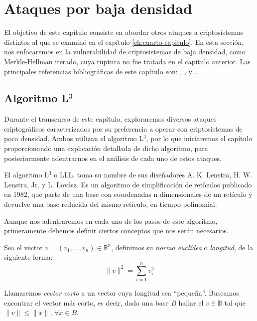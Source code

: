\chapter{Ataques por baja densidad} \label{ch:quinto-capitulo}

     El objetivo de este capítulo consiste en abordar otros ataques a criptosistemas distintos al que se examinó en el capítulo \ref{ch:cuarto-capitulo}. En esta sección, nos enfocaremos en la vulnerabilidad de criptosistemas de baja densidad, como Merkle-Hellman iterado, cuya ruptura no fue tratada en el capítulo anterior. Las principales referencias bibliográficas de este capítulo son: \cite{artLagOdl}, \cite{artLLL}, \cite{artCoster} y \cite{tfgLag}.
    
    \section{Algoritmo L\texorpdfstring{$^3$}{3}}

    Durante el transcurso de este capítulo, exploraremos diversos ataques criptográficos caracterizados por su preferencia a operar con criptosistemas de poca densidad. Ambos utilizan el algoritmo L$^{3}$, por lo que iniciaremos el capítulo proporcionando una explicación detallada de dicho algoritmo, para posteriormente adentrarnos en el análisis de cada uno de estos ataques.

    El algoritmo L$^{3}$ o LLL, toma su nombre de sus diseñadores A. K. Lenstra, H. W. Lenstra, Jr. y L. Lovász. Es un algoritmo de simplificación de retículos publicado en $1982$, que parte de una base con coordenadas n-dimensionales de un retículo y devuelve una base reducida del mismo retículo, en tiempo polinomial.

    Aunque nos adentraremos en cada uno de los pasos de este algoritmo, primeramente debemos definir ciertos conceptos que nos serán necesarios.

    \begin{definicion} \cite{artLagOdl}
        Sea el vector $v = (v_{1}, ... , v_{n}) \in \mathbb{R}^{n}$, definimos su \textit{norma euclídea} o \textit{longitud}, de la siguiente forma:
        \begin{equation}
            \|v\|^{2} = \sum_{i=1}^{n} v_{i}^{2}
        \end{equation}
    \end{definicion}
    
    Llamaremos \textit{vector corto} a un vector cuya longitud sea ``pequeña''. Buscamos encontrar el vector más corto, es decir, dada una base $B$ hallar el $v \in \mathbb{B}$ tal que $\| v \| \leq \| x \| \text{, } \forall x\in B$.  

